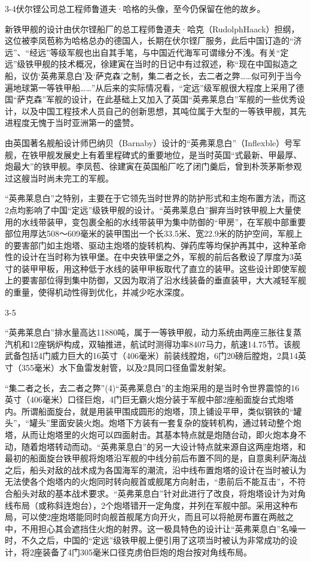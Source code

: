 \documentclass[12pt,UTF8]{ctexbook}
\begin{document}
3-4伏尔铿公司总工程师鲁道夫·哈格的头像，至今仍保留在他的故乡。

新铁甲舰的设计由伏尔铿船厂的总工程师鲁道夫·哈克（RudolphHaack）担纲，这位被李凤苞称为哈格总办的德国人，长期在伏尔铿厂服务，此后中国订造的“济远”、“经远”等级军舰也出自其手笔，与中国近代海军可谓缘分不浅。有关“定远”级铁甲舰的技术概况，徐建寅在当时的日记中有过叙述，称“现在中国拟造之船，议仿‘英弗莱息白’及‘萨克森’之制，集二者之长，去二者之弊……似可列于当今遍地球第一等铁甲船……”从后来的实际情况看，“定远”级军舰很大程度上采用了德国“萨克森”军舰的设计，在此基础上又加入了英国“英弗莱息白”军舰的一些优秀设计，以及中国工程技术人员自己的创新思想，其吨位属于大型的一等铁甲舰，其先进程度无愧于当时亚洲第一的盛赞。

由英国著名舰船设计师巴纳贝（Barnaby）设计的“英弗莱息白”（Inflexble）号军舰，在铁甲舰发展史上有着里程碑式的重要地位，是当时英国“式最新、甲最厚、炮最大”的铁甲舰。李凤苞、徐建寅在英国船厂吃了闭门羹后，曾到朴茨茅斯参观过这艘当时尚未完工的军舰。

“英弗莱息白”之特别，主要在于它领先当时世界的防护形式和主炮布置方法，而这2点均影响了中国“定远”级铁甲舰的设计。“英弗莱息白”摒弃当时铁甲舰上大量使用的水线带装甲，变包裹全船的水线带装甲为集中防御的“甲房”，在军舰中部重要部位用厚达508～609毫米的装甲围出一个长33.5米、宽22.9米的防护空间，军舰上的要害部门如主炮塔、驱动主炮塔的旋转机构、弹药库等均保护再其中，这种革命性的设计在当时称为铁甲堡。在中央铁甲堡之外，军舰的前后各敷设了厚度为3英寸的装甲甲板，用这种低于水线的装甲甲板取代了直立的装甲。这些设计即使军舰上的要害部位得到集中防御，又因为取消了沿水线装备的垂直装甲，大大减轻军舰的重量，使得机动性得到优化，并减少吃水深度。

3-5

“英弗莱息白”排水量高达11880吨，属于一等铁甲舰，动力系统由两座三胀往复蒸汽机和12座锅炉构成，双轴推进，航试时测得功率8407马力，航速14.75节。该舰武备包括4门威力巨大的16英寸（406毫米）前装线膛炮，6门20磅后膛炮，2具14英寸（355毫米）水下鱼雷发射管，以及2具同口径鱼雷发射架。

“集二者之长，去二者之弊”(4)“英弗莱息白”的主炮采用的是当时令世界震惊的16英寸（406毫米）口径巨炮，4门巨无霸火炮分装于军舰中部2座船面旋台式炮塔内。所谓船面旋台，就是用装甲围成圆形的炮塔，顶上铺设平甲，类似钢铁的“罐头”，“罐头”里面安装火炮。炮塔下方装有一套复杂的旋转机构，通过转动整个炮塔，从而让炮塔里的火炮可以四面射击。其基本特点就是炮随台动，即火炮本身不动，随着炮塔转动而动。“英弗莱息白”的另一大设计特点就来源自这两座炮塔，和最初的船面旋台铁甲舰将炮塔沿军舰的中线分前后布置不同的是，自意奥利萨海战之后，船头对敌的战术成为各国海军的潮流，沿中线布置炮塔的设计在当时被认为无法使各个炮塔内的火炮同时转向舰首或舰尾方向射击，“患前后不能互击”，不符合船头对敌的基本战术要求。“英弗莱息白”针对此进行了改良，将炮塔设计为对角线布局（或称斜连炮台），2个炮塔错开一定角度，并列在军舰中部。采用这种布局，可以使2座炮塔能同时向舰首舰尾方向开火，而且可以将舱房布置在两舷之中，不用担心其会遮挡住火炮的射界。这一极具特色的设计让“英弗莱息白”名噪一时，不久之后，中国的“定远”级铁甲舰上便引用了这项当时被认为非常成功的设计，将2座装备了4门305毫米口径克虏伯巨炮的炮台按对角线布局。
\end{document}
